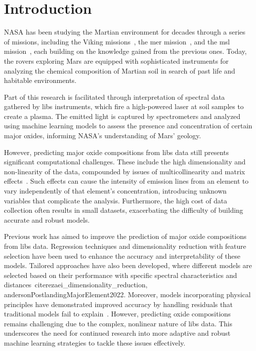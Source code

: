 \section{Introduction}\label{sec:introduction}
NASA has been studying the Martian environment for decades through a series of missions, including the Viking missions~\cite{marsnasagov_vikings}, the \gls{mer} mission~\cite{marsnasagov_observer, marsnasagov_spirit_opportunity}, and the \gls{msl} mission~\cite{marsnasagov_msl}, each building on the knowledge gained from the previous ones.
Today, the rovers exploring Mars are equipped with sophisticated instruments for analyzing the chemical composition of Martian soil in search of past life and habitable environments.

Part of this research is facilitated through interpretation of spectral data gathered by \gls{libs} instruments, which fire a high-powered laser at soil samples to create a plasma.
The emitted light is captured by spectrometers and analyzed using machine learning models to assess the presence and concentration of certain major oxides, informing NASA's understanding of Mars' geology.

However, predicting major oxide compositions from \gls{libs} data still presents significant computational challenges.
These include the high dimensionality and non-linearity of the data, compounded by issues of multicollinearity and matrix effects~\cite{andersonImprovedAccuracyQuantitative2017}.
Such effects can cause the intensity of emission lines from an element to vary independently of that element's concentration, introducing unknown variables that complicate the analysis.
Furthermore, the high cost of data collection often results in small datasets, exacerbating the difficulty of building accurate and robust models.

Previous work has aimed to improve the prediction of major oxide compositions from \gls{libs} data.
Regression techniques and dimensionality reduction with feature selection have been used to enhance the accuracy and interpretability of these models.
Tailored approaches have also been developed, where different models are selected based on their performance with specific spectral characteristics and distances~cite{rezaei_dimensionality_reduction, andersonPostlandingMajorElement2022}.
Moreover, models incorporating physical principles have demonstrated improved accuracy by handling residuals that traditional models fail to explain~\cite{song_DF-K-ELM}.
However, predicting oxide compositions remains challenging due to the complex, nonlinear nature of \gls{libs} data.
This underscores the need for continued research into more adaptive and robust machine learning strategies to tackle these issues effectively.

